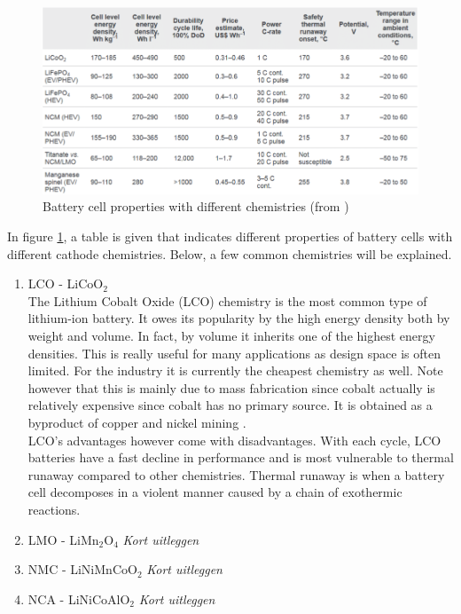 \begin{figure} [H]
 	\centering
 	\includegraphics[width=0.9\linewidth]{Figures/chemistry_table.PNG}
 	\caption{Battery cell properties with different chemistries (from \cite{slides})}
    \label{Fig:Chemistry_table}
\end{figure}

In figure \ref{Fig:Chemistry_table}, a table is given that indicates different properties of battery cells with different cathode chemistries. Below, a few common chemistries will be explained.\\
\begin{enumerate}
\item LCO - LiCoO$_2$\\
The Lithium Cobalt Oxide (LCO) chemistry is the most common type of lithium-ion battery. It owes its popularity by the high energy density both by weight and volume. In fact, by volume it inherits one of the highest energy densities. This is really useful for many applications as design space is often limited. For the industry it is currently the cheapest chemistry as well. Note however that this is mainly due to mass fabrication since cobalt actually is relatively expensive since cobalt has no primary source. It is obtained as a byproduct of copper and nickel mining \cite{cobalt}.\\
LCO's advantages however come with disadvantages. With each cycle, LCO batteries have a fast decline in performance and is most vulnerable to thermal runaway compared to other chemistries. Thermal runaway is when a battery cell decomposes in a violent manner caused by a chain of exothermic reactions.

\item LMO - LiMn$_2$O$_4$
\textit{Kort uitleggen}

\item NMC - LiNiMnCoO$_2$
\textit{Kort uitleggen}

\item NCA - LiNiCoAlO$_2$
\textit{Kort uitleggen}

\end{enumerate}

